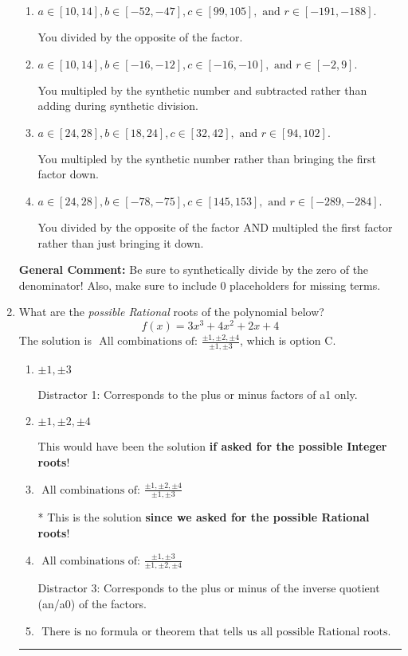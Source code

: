 \documentclass{extbook}[14pt]
\newcommand{\litem}[1]{\item #1

\rule{\textwidth}{0.4pt}}
\begin{document}
\begin{enumerate}
{\begin{enumerate}[label=\Alph*.]
* This is the solution!
\item \( a \in [10, 14], b \in [-52, -47], c \in [99, 105], \text{ and } r \in [-191, -188]. \)

 You divided by the opposite of the factor.
\item \( a \in [10, 14], b \in [-16, -12], c \in [-16, -10], \text{ and } r \in [-2, 9]. \)

 You multipled by the synthetic number and subtracted rather than adding during synthetic division.
\item \( a \in [24, 28], b \in [18, 24], c \in [32, 42], \text{ and } r \in [94, 102]. \)

 You multipled by the synthetic number rather than bringing the first factor down.
\item \( a \in [24, 28], b \in [-78, -75], c \in [145, 153], \text{ and } r \in [-289, -284]. \)

 You divided by the opposite of the factor AND multipled the first factor rather than just bringing it down.
\end{enumerate}

\textbf{General Comment:} Be sure to synthetically divide by the zero of the denominator! Also, make sure to include 0 placeholders for missing terms.
}
\litem{
What are the \textit{possible Rational} roots of the polynomial below?
\[ f(x) = 3x^{3} +4 x^{2} +2 x + 4 \]The solution is \( \text{ All combinations of: }\frac{\pm 1,\pm 2,\pm 4}{\pm 1,\pm 3} \), which is option C.\begin{enumerate}[label=\Alph*.]
\item \( \pm 1,\pm 3 \)

 Distractor 1: Corresponds to the plus or minus factors of a1 only.
\item \( \pm 1,\pm 2,\pm 4 \)

This would have been the solution \textbf{if asked for the possible Integer roots}!
\item \( \text{ All combinations of: }\frac{\pm 1,\pm 2,\pm 4}{\pm 1,\pm 3} \)

* This is the solution \textbf{since we asked for the possible Rational roots}!
\item \( \text{ All combinations of: }\frac{\pm 1,\pm 3}{\pm 1,\pm 2,\pm 4} \)

 Distractor 3: Corresponds to the plus or minus of the inverse quotient (an/a0) of the factors. 
\item \( \text{ There is no formula or theorem that tells us all possible Rational roots.} \)


\end{enumerate}}
\end{enumerate}
\end{document}

